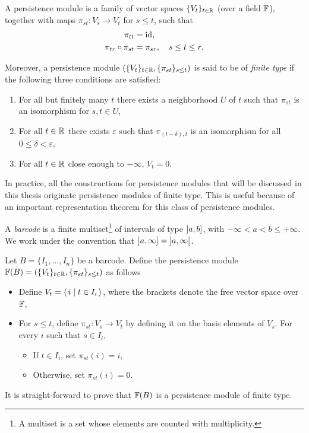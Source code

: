 \begin{definition}
A persistence module is a family of vector spaces $\{V_t\}_{t \in \mathbb{R}}$ (over a field $\mathbb{F}$), together with maps $\pi_{st} \colon V_s \to V_t$ for $s \leq t$, such that
\begin{align}
\pi_{tt} &= \mathrm{id},\\
\pi_{tr} \circ \pi_{st} &= \pi_{sr}, \quad s \leq t \leq r.
\end{align}

Moreover, a persistence module $(\{V_t\}_{t \in \mathbb{R}}, \{\pi_{st}\}_{s\leq t})$ is said to be of \emph{finite type} if the following three conditions are satisfied:
\begin{enumerate}
\item For all but finitely many $t$ there exists a neighborhood $U$ of $t$ such that $\pi_{st}$ is an isomorphism for $s, t \in U$,
\item For all $t \in \mathbb{R}$ there exists $\varepsilon$ such that $\pi_{(t-\delta), t}$ is an isomorphism for all $0 \leq \delta < \varepsilon$,
\item\label{pm3} For all $t \in \mathbb{R}$ close enough to $-\infty$, $V_t = 0$.
\end{enumerate}
\end{definition}

In practice, all the constructions for persistence modules that will be discussed in this thesis originate persistence modules of finite type. This is useful because of an important representation theorem for this class of persistence modules.

\begin{definition}
A \emph{barcode} is a finite multiset\footnote{A multiset is a set whose elements are counted with multiplicity.} of intervals of type $\linterval a b$, with $-\infty < a < b \leq +\infty$. We work under the convention that $\linterval a \infty = \ointerval a \infty$.
\end{definition}

\begin{definition}
Let $B = \{I_1, \dots, I_n\}$ be a barcode. Define the persistence module $\mathbb{F}(B) = (\{V_t\}_{t \in \mathbb{R}}, \{\pi_{st}\}_{s \leq t})$ as follows
\begin{itemize}
\item Define $V_t = \langle\,i \mid t \in I_i\,\rangle$, where the brackets denote the free vector space over $\mathbb{F}$,
\item For $s \leq t$, define $\pi_{st} \colon V_s \to V_t$ by defining it on the basis elements of $V_s$. For every $i$ such that $s \in I_i$,
\begin{itemize}
\item If $t \in I_i$, set $\pi_{st}(i) = i$,
\item Otherwise, set $\pi_{st}(i) = 0$.
\end{itemize}
\end{itemize}

It is straight-forward to prove that $\mathbb{F}(B)$ is a persistence module of finite type.
\end{definition}

